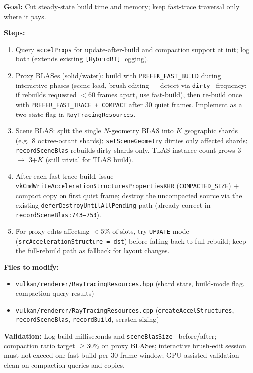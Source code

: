 \documentclass[11pt,a4paper]{article}
\begin{document}
\begin{tcolorbox}[promptbox={Prompt: Tiered BLAS Build Strategy with Compaction}]
\textbf{Goal:} Cut steady-state build time and memory; keep fast-trace traversal only where it pays.

\textbf{Steps:}
\begin{enumerate}
    \item Query \texttt{accelProps} for update-after-build and compaction support at init; log both (extends existing \texttt{[HybridRT]} logging).
    \item Proxy BLASes (solid/water): build with \texttt{PREFER\_FAST\_BUILD} during interactive phases (scene load, brush editing --- detect via \texttt{dirty\_} frequency: if rebuilds requested $< 60$ frames apart, use fast-build), then re-build once with \texttt{PREFER\_FAST\_TRACE + COMPACT} after 30 quiet frames. Implement as a two-state flag in \texttt{RayTracingResources}.
    \item Scene BLAS: split the single $N$-geometry BLAS into $K$ geographic shards (e.g.\ 8 octree-octant shards); \texttt{setSceneGeometry} dirties only affected shards; \texttt{recordSceneBlas} rebuilds dirty shards only. TLAS instance count grows 3 $\rightarrow$ 3$+K$ (still trivial for TLAS build).
    \item After each fast-trace build, issue \texttt{vkCmdWriteAccelerationStructuresPropertiesKHR} (\texttt{COMPACTED\_SIZE}) $+$ compact copy on first quiet frame; destroy the uncompacted source via the existing \texttt{deferDestroyUntilAllPending} path (already correct in \texttt{recordSceneBlas:743--753}).
    \item For proxy edits affecting $< 5\%$ of slots, try \texttt{UPDATE} mode (\texttt{srcAccelerationStructure = dst}) before falling back to full rebuild; keep the full-rebuild path as fallback for layout changes.
\end{enumerate}

\textbf{Files to modify:}
\begin{itemize}
    \item \texttt{vulkan/renderer/RayTracingResources.hpp} (shard state, build-mode flag, compaction query results)
    \item \texttt{vulkan/renderer/RayTracingResources.cpp} (\texttt{createAccelStructures}, \texttt{recordSceneBlas}, \texttt{recordBuild}, scratch sizing)
\end{itemize}

\textbf{Validation:} Log build milliseconds and \texttt{sceneBlasSize\_} before/after; compaction ratio target $\geq$30\% on proxy BLASes; interactive brush-edit session must not exceed one fast-build per 30-frame window; GPU-assisted validation clean on compaction queries and copies.
\end{tcolorbox}
\end{document}
